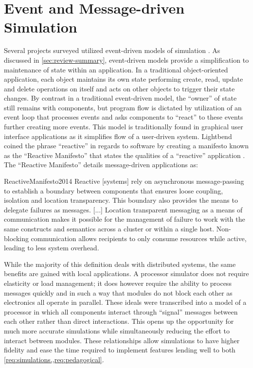 \section{Event and Message-driven Simulation}

Several projects surveyed utilized event-driven models of simulation \cite{Nakamura2013, McLoughlin2010, Garcia2009}. As discussed in \cref{sec:review-summary}, event-driven models provide a simplification to maintenance of state within an application. In a traditional object-oriented application, each object maintains its own state performing create, read, update and delete operations on itself and acts on other objects to trigger their state changes. By contrast in a traditional event-driven model, the ``owner'' of state still remains with components, but program flow is dictated by utilization of an event loop that processes events and asks components to ``react'' to these events further creating more events. This model is traditionally found in graphical user interface applications as it simplifies flow of a user-driven system. Lightbend coined the phrase ``reactive'' in regards to software by creating a manifesto known as the ``Reactive Manifesto'' that states the qualities of a ``reactive'' application \cite{ReactiveManifesto2014}. The ``Reactive Manifesto'' details message-driven applications as: 
\begin{displaycquote}{ReactiveManifesto2014}
    Reactive [systems] rely on asynchronous message-passing to establish a boundary between components that ensures loose coupling, isolation and location transparency. This boundary also provides the means to delegate failures as messages. [...] Location transparent messaging as a means of communication makes it possible for the management of failure to work with the same constructs and semantics across a cluster or within a single host. Non-blocking communication allows recipients to only consume resources while active, leading to less system overhead.
\end{displaycquote}
While the majority of this definition deals with distributed systems, the same benefits are gained with local applications. A processor simulator does not require elasticity or load management; it does however require the ability to process messages quickly and in such a way that modules do not block each other as electronics all operate in parallel. These ideals were transcribed into a model of a processor in which all components interact through ``signal'' messages between each other rather than direct interactions. This opens up the opportunity for much more accurate simulations while simultaneously reducing the effort to interact between modules. These relationships allow simulations to have higher fidelity and ease the time required to implement features lending well to both \cref{req:simulations,,req:pedagogical}. 

